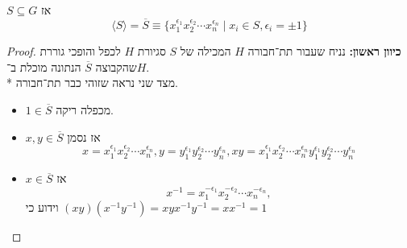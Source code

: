 \begin{proposition}
	$S \subseteq G$ אז
	\[
		\langle S \rangle = \overline{S} \equiv \{ x_1^{\epsilon_1}x_2^{\epsilon_2} \cdots x_n^{\epsilon_n} \mid x_i \in S, \epsilon_i = \pm 1 \}
	\]
\end{proposition}
\begin{proof}
	\textbf{כיוון ראשון:}
	נניח שעבור תת־חבורה $H$ המכילה של $S$ סגיורת $H$ לכפל והופכי גוררת שהקבוצה $\overline{S}$ הנתונה מוכלת ב־$H$. \\*
	מצד שני נראה שזוהי כבר תת־חבורה.
	\begin{itemize}
		\item $1 \in \overline{S}$ מכפלה ריקה.
		\item $x, y \in \overline{S}$ אז נסמן
			\[
				x = x_1^{\epsilon_1}x_2^{\epsilon_2} \cdots x_n^{\epsilon_n},
				y = y_1^{\epsilon_1}y_2^{\epsilon_2} \cdots y_n^{\epsilon_n},
				xy = x_1^{\epsilon_1}x_2^{\epsilon_2} \cdots x_n^{\epsilon_n} y_1^{\epsilon_1}y_2^{\epsilon_2} \cdots y_n^{\epsilon_n}
			\]
		\item $x \in \overline{S}$ אז
			\[
				x^{-1} = x_1^{-\epsilon_1}x_2^{-\epsilon_2} \cdots x_n^{-\epsilon_n},
			\]
			וידוע כי $(x y)(x^{-1} y^{-1}) = x y x^{-1} y^{-1} = x x^{-1} = 1$
	\end{itemize}
\end{proof}

